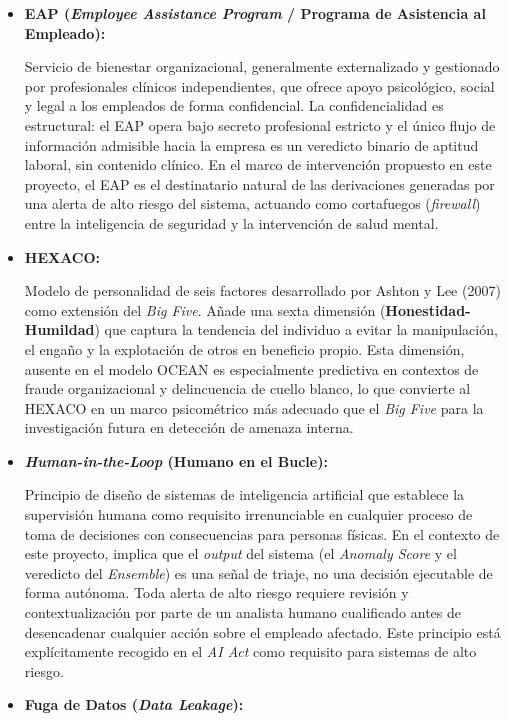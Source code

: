 \documentclass[IB]{TFUOC}%
\begin{document}
\begin{itemize}
    \item \textbf{EAP (\textit{Employee Assistance Program} / 
    Programa de Asistencia al Empleado):}
    
    Servicio de bienestar organizacional, generalmente externalizado y gestionado por profesionales clínicos independientes, que ofrece apoyo psicológico, social y legal a los empleados de forma confidencial. La confidencialidad es estructural: el EAP 
    opera bajo secreto profesional estricto y el único flujo de información admisible hacia la empresa es un veredicto binario de aptitud laboral, sin contenido clínico. En el marco de intervención propuesto en este proyecto, el EAP es el destinatario natural de las derivaciones generadas por una alerta de alto riesgo del sistema, actuando como cortafuegos (\textit{firewall}) entre la inteligencia de seguridad y la intervención de salud mental.

    \item \textbf{HEXACO:}
    
    Modelo de personalidad de seis factores desarrollado por Ashton y Lee (2007) como extensión del \textit{Big Five}. Añade una sexta dimensión (\textbf{Honestidad-Humildad}) 
    que captura la tendencia del individuo a evitar la manipulación, el engaño y la explotación de otros en beneficio propio. Esta dimensión, ausente en el modelo OCEAN es especialmente predictiva en contextos de fraude organizacional y delincuencia de cuello blanco, lo que convierte al HEXACO en un marco psicométrico más adecuado que el \textit{Big Five} para la investigación futura en detección de amenaza interna.

    \item \textbf{\textit{Human-in-the-Loop} (Humano en el Bucle):}
    
    Principio de diseño de sistemas de inteligencia artificial que establece la supervisión humana como requisito irrenunciable en cualquier proceso de toma de decisiones con consecuencias para personas físicas. En el contexto de este proyecto, implica 
    que el \textit{output} del sistema (el \textit{Anomaly Score} y el veredicto del \textit{Ensemble}) es una señal de triaje, no una decisión ejecutable de forma autónoma. Toda alerta de alto riesgo requiere revisión y contextualización por parte de 
    un analista humano cualificado antes de desencadenar cualquier acción sobre el empleado afectado. Este principio está explícitamente recogido en el \textit{AI Act} como requisito para sistemas de alto riesgo.


    \item \textbf{Fuga de Datos (\textit{Data Leakage}):}
    

\end{itemize}
\end{document}
